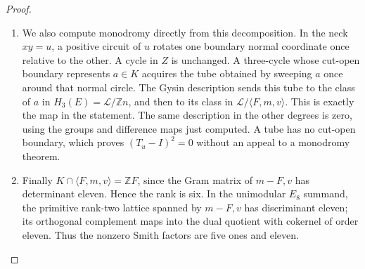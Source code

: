 \begin{proof}
\begin{enumerate}[label=\arabic*.,leftmargin=*]
\item We also compute monodromy directly from this decomposition.
In the neck $xy=u$, a positive circuit of $u$ rotates one
boundary normal coordinate once relative to the other.
A cycle in $Z$ is unchanged. A three-cycle whose cut-open
boundary represents $a\in K$ acquires the tube obtained
by sweeping $a$ once around that normal circle. The Gysin
description sends this tube to the class of $a$ in
$H_3(E)=\mathcal L/\mathbb Z n$, and then to its class in
$\mathcal L/\langle F,m,v\rangle$. This is exactly the
map in the statement. The same description in the other
degrees is zero, using the groups and difference maps just
computed. A tube has no cut-open boundary, which proves
$(T_u-I)^2=0$ without an appeal to a monodromy theorem.

\item Finally $K\cap\langle F,m,v\rangle=\mathbb ZF$, since
the Gram matrix of $m-F,v$ has determinant eleven.
Hence the rank is six. In the unimodular $E_8$ summand,
the primitive rank-two lattice spanned by $m-F,v$ has
discriminant eleven; its orthogonal complement maps into
the dual quotient with cokernel of order eleven. Thus the nonzero Smith factors are five ones and eleven.
\end{enumerate}
\end{proof}
